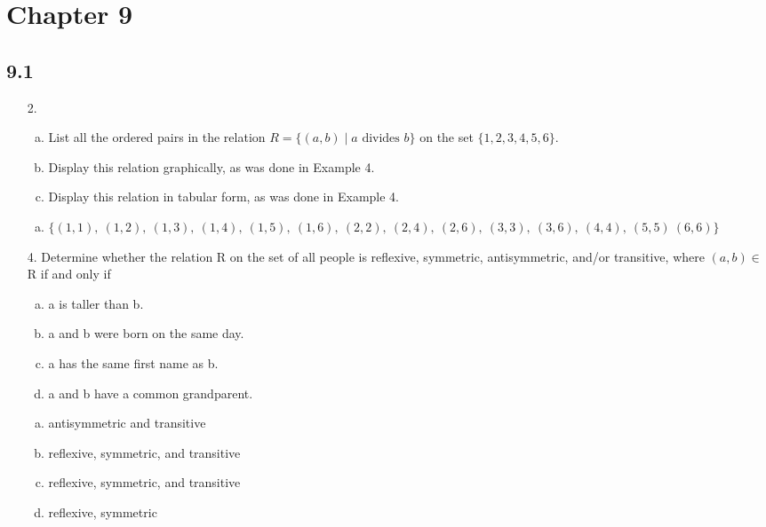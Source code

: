 \section{Chapter 9}
\subsection{9.1}
\begin{itemize}
    \item[2.]
          \begin{enumerate}[a.]
              \item List all the ordered pairs in the relation $R = \{(a, b) \mid a \text{ divides } b\}$ on the set $\{1, 2, 3, 4, 5, 6\}$.
              \item Display this relation graphically, as was done in Example 4.
              \item Display this relation in tabular form, as was done in Example 4.
          \end{enumerate}
          \answer
          \begin{enumerate}[a.]
              \item $\{(1,1),\ (1,2),\ (1,3),\ (1,4),\ (1,5),\ (1,6),\ (2,2),\ (2,4),\ (2,6),\ (3,3),\ (3,6),\ (4,4),\ (5,5)\ (6,6)\}$
          \end{enumerate}
    \item[4.]  Determine whether the relation R on the set of all people
          is reflexive, symmetric, antisymmetric, and/or transitive,
          where $(a, b) \in$ R if and only if
          \begin{enumerate}[a.]
              \item a is taller than b.
              \item a and b were born on the same day.
              \item a has the same first name as b.
              \item a and b have a common grandparent.
          \end{enumerate}
          \answer
          \begin{enumerate}[a.]
              \item antisymmetric and transitive
              \item reflexive, symmetric, and transitive
              \item reflexive, symmetric, and transitive
              \item reflexive, symmetric

\end{enumerate}
\end{itemize}
